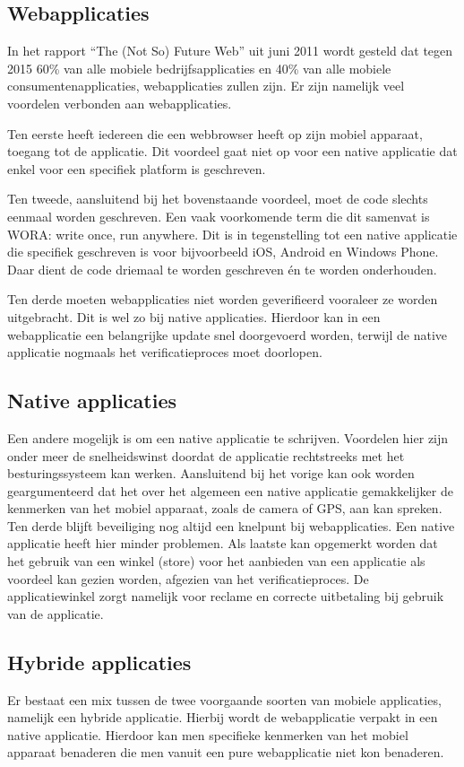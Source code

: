 \subsection{Webapplicaties}
In het rapport “The (Not So) Future Web” uit juni 2011 wordt gesteld dat tegen 2015 60\% van alle mobiele bedrijfsapplicaties en 40\% van alle mobiele consumentenapplicaties, webapplicaties zullen zijn. Er zijn namelijk veel voordelen verbonden aan webapplicaties.

Ten eerste heeft iedereen die een webbrowser heeft op zijn mobiel apparaat, toegang tot de applicatie.  Dit voordeel gaat niet op voor een native applicatie dat enkel voor een specifiek platform is geschreven. 

Ten tweede, aansluitend bij het bovenstaande voordeel, moet de code slechts eenmaal worden geschreven. Een vaak voorkomende term die dit samenvat is WORA: write once, run anywhere. Dit is in tegenstelling tot een native applicatie die specifiek geschreven is voor bijvoorbeeld iOS, Android en Windows Phone. Daar dient de code driemaal te worden geschreven én te worden onderhouden.

Ten derde moeten webapplicaties niet worden geverifieerd vooraleer ze worden uitgebracht. Dit is wel zo bij native applicaties. Hierdoor kan in een webapplicatie een belangrijke update snel doorgevoerd worden, terwijl de native applicatie nogmaals het verificatieproces moet doorlopen.

\subsection{Native applicaties}
Een andere mogelijk is om een native applicatie te schrijven. Voordelen hier zijn onder meer de snelheidswinst doordat de applicatie rechtstreeks met het besturingssysteem kan werken. Aansluitend bij het vorige kan ook worden geargumenteerd dat het over het algemeen een native applicatie gemakkelijker de kenmerken van het mobiel apparaat, zoals de camera of GPS, aan kan spreken. Ten derde blijft beveiliging nog altijd een knelpunt bij webapplicaties. Een native applicatie heeft hier minder problemen. Als laatste kan opgemerkt worden dat het gebruik van een winkel (store) voor het aanbieden van een applicatie als voordeel kan gezien worden, afgezien van het verificatieproces. De applicatiewinkel zorgt namelijk voor reclame en correcte uitbetaling bij gebruik van de applicatie.

\subsection{Hybride applicaties}
Er bestaat een mix tussen de twee voorgaande soorten van mobiele applicaties, namelijk een hybride applicatie. Hierbij wordt de webapplicatie verpakt in een native applicatie. Hierdoor kan men specifieke kenmerken van het mobiel apparaat benaderen die men vanuit een pure webapplicatie niet kon benaderen.

